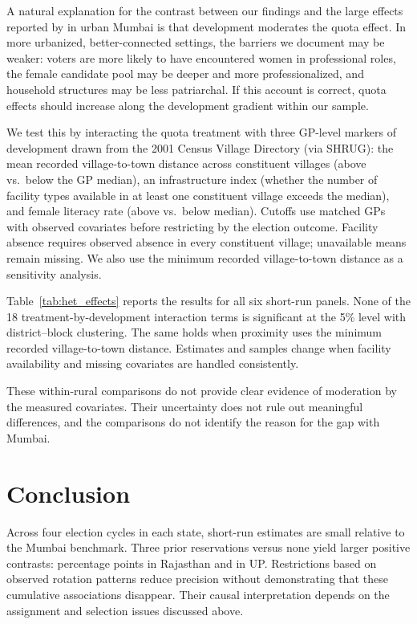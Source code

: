 \documentclass[12pt]{article}
\begin{document}
A natural explanation for the contrast between our findings and the large effects reported by \citet{bhavnani2009electoral} in urban Mumbai is that development moderates the quota effect. In more urbanized, better-connected settings, the barriers we document may be weaker: voters are more likely to have encountered women in professional roles, the female candidate pool may be deeper and more professionalized, and household structures may be less patriarchal. If this account is correct, quota effects should increase along the development gradient within our sample.

We test this by interacting the quota treatment with three GP-level markers of development drawn from the 2001 Census Village Directory (via SHRUG): the mean recorded village-to-town distance across constituent villages (above vs.\ below the GP median), an infrastructure index (whether the number of facility types available in at least one constituent village exceeds the median), and female literacy rate (above vs.\ below median). Cutoffs use matched GPs with observed covariates before restricting by the election outcome. Facility absence requires observed absence in every constituent village; unavailable means remain missing. We also use the minimum recorded village-to-town distance as a sensitivity analysis.

Table~\ref{tab:het_effects} reports the results for all six short-run panels. None of the 18 treatment-by-development interaction terms is significant at the 5\% level with district--block clustering. The same holds when proximity uses the minimum recorded village-to-town distance. Estimates and samples change when facility availability and missing covariates are handled consistently.

These within-rural comparisons do not provide clear evidence of moderation by the measured covariates. Their uncertainty does not rule out meaningful differences, and the comparisons do not identify the reason for the gap with Mumbai.

\section{Conclusion}\label{sec:conclusion}

Across four election cycles in each state, short-run estimates are small relative to the Mumbai benchmark. Three prior reservations versus none yield larger positive contrasts: \rajFullAlways{} percentage points in Rajasthan and \upFullAlways{} in UP. Restrictions based on observed rotation patterns reduce precision without demonstrating that these cumulative associations disappear. Their causal interpretation depends on the assignment and selection issues discussed above.
\end{document}
